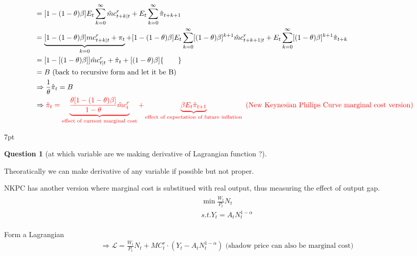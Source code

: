 \documentclass{article}
\newenvironment{redblock}{
\def\FrameCommand{
  \hspace{1pt}
    {\color{LightCoral}
    \vrule width 2pt}
    {\color{redshade}
    \vrule width 4pt}
  \colorbox{redshade}
}
\MakeFramed{
  \advance
  \hsize-
  \width
  \FrameRestore}
\noindent\hspace{-4.55pt}%
\begin{adjustwidth}{}{7pt}
\vspace{2pt}\vspace{2pt}
}
{\vspace{2pt}\end{adjustwidth}\endMakeFramed}
\newtheorem{question}{Question}
\begin{document}
\begin{align}
& =[1-(1-\theta)\beta]E_t \sum\limits_{k=0}^\infty \hat mc^r_{t+k|t}+E_t \sum\limits_{k=0}^\infty \hat \pi_{t+k+1}
\\& = \underbrace{
  [1-(1-\theta)\beta] mc^r_{t+k|t} +\pi_t
}_{k=0}
+[1-(1-\theta)\beta]E_t \sum\limits_{k=0}^\infty [(1-\theta)\beta]^{k+1}\hat mc^r_{t+k+1|t}+E_t \sum\limits_{k=0}^\infty [(1-\theta)\beta]^{k+1}\hat \pi_{t+k}
\\& = [1-[(1-\theta)\beta]]\hat mc^r_{t|t}+\hat \pi_t +[(1-\theta)\beta]\{\quad \quad \}
\\& = B \text{ (back to recursive form and let it be B)}
\\& \Rightarrow \frac{1}{\theta}\hat \pi_t=B
\\& \Rightarrow \color{red} \hat \pi_t=\underbrace{\frac{\theta[1-(1-\theta)\beta]}{1-\theta}\hat mc^r_t}_{\text{effect of current marginal cost}} +\underbrace{\beta E_t \hat \pi_{t+1}}_{\text{effect of expectation of future inflation}} \text{ (New Keynesian Philips Curve marginal cost version)}
\end{align}

\begin{redblock}
\begin{question}[at which variable are we making derivative of Lagrangian function ?]
\end{question}
Theoratically we can make derivative of any variable if possible but not proper.
\end{redblock}

NKPC has another version where marginal cost is substitued with real output, thus measuring the effect of output gap.
\begin{align}
\begin{split}
& \min \frac{W_t}{P_t}N_t
\\& s.t. Y_t =A_t N_t^{1-\alpha}
\end{split}
\end{align}

Form a Lagrangian
\begin{align}
& \Rightarrow \mathscr{L}=\frac{W_t}{P_t}N_t +MC_t^r\cdot(Y_t -A_t N_t^{1-\alpha})\text{ (shadow price can also be marginal cost)}
\end{align}
\end{document}
